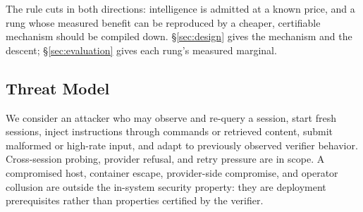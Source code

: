 The rule cuts in both directions: intelligence is admitted at a known
price, and a rung whose measured benefit can be reproduced by a
cheaper, certifiable mechanism should be compiled down.
\S\ref{sec:design} gives the mechanism and the descent;
\S\ref{sec:evaluation} gives each rung's measured marginal.

\subsection{Threat Model}

We consider an attacker who may observe and re-query a session, start
fresh sessions, inject instructions through commands or retrieved
content, submit malformed or high-rate input, and adapt to previously
observed verifier behavior. Cross-session probing, provider refusal,
and retry pressure are in scope. A compromised host, container escape,
provider-side compromise, and operator collusion are outside the
in-system security property: they are deployment prerequisites rather
than properties certified by the verifier.

